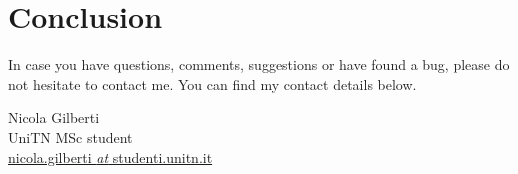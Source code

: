 \chapter{Conclusion}\label{ch:conclusion}
In case you have questions, comments, suggestions or have found a bug, please do not hesitate to contact me. You can find my contact details below.
  \begin{center}
    Nicola Gilberti\\
    UniTN MSc student\\
    
    \href{mailto:nicola.gilberti@studenti.unitn.it}{\footnotesize nicola.gilberti \textit{at} studenti.unitn.it}
  \end{center}



\newpage